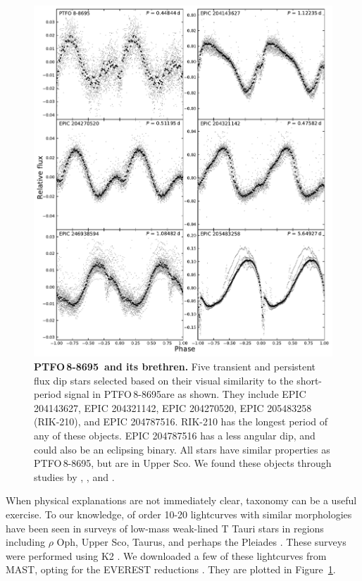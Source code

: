 \documentclass[12pt,twocolumn,tighten]{aastex62}
\newcommand{\ptfo}{PTFO$\,$8-8695}
\begin{document}
\begin{figure}[hbtp]
	\begin{center}
		\leavevmode
		\includegraphics[width=1\textwidth]{f7.pdf}
	\end{center}
	\vspace{-0.7cm}
  \caption{ {\bf \ptfo\ and its brethren.}
    Five transient and persistent flux dip stars selected based on
    their visual similarity to the short-period signal in \ptfo are as
    shown.  They include EPIC 204143627, EPIC 204321142, EPIC
    204270520, EPIC 205483258 (RIK-210), and EPIC 204787516.  RIK-210
    has the longest period of any of these objects.  EPIC 204787516
    has a less angular dip, and could also be an eclipsing binary.
    All stars have similar properties as \ptfo, but are in Upper Sco.
    We found these objects through studies by
    \citet{stauffer_orbiting_2017}, \citet{david_transient_2017}, and
    \citet{rebull_usco_2018}.
		\label{fig:brethren}
	}
\end{figure}

When physical explanations are not immediately clear, taxonomy can be
a useful exercise.  To our knowledge, of order 10-20 lightcurves with
similar morphologies have been seen in surveys of low-mass weak-lined
T Tauri stars in regions including $\rho$ Oph, Upper Sco, Taurus, and perhaps
the Pleiades
\citep{rebull_rotation_2016,david_transient_2017,stauffer_orbiting_2017,stauffer_rotevol_2018,rebull_usco_2018,rebull_rotation_2020}.
These surveys were performed using K2 \citep{howell_k2_2014}.  We
downloaded a few of these lightcurves from MAST, opting for the
EVEREST reductions \citep{luger_everest_2016,luger_update_2018}.  They
are plotted in Figure~\ref{fig:brethren}.
\end{document}
